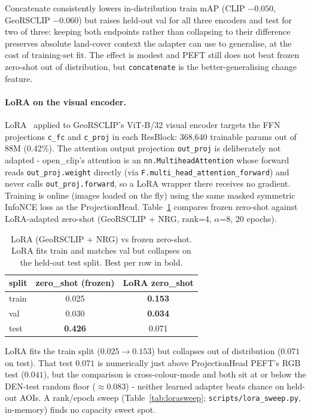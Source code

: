 \documentclass{article}
\begin{document}
Concatenate consistently lowers in-distribution train mAP (CLIP $-0.050$,
GeoRSCLIP $-0.060$) but raises held-out val for all three encoders and test for
two of three: keeping both endpoints rather than collapsing to their difference
preserves absolute land-cover context the adapter can use to generalise, at the
cost of training-set fit. The effect is modest and PEFT still does not beat
frozen zero-shot out of distribution, but \texttt{concatenate} is the
better-generalising change feature.

\paragraph{LoRA on the visual encoder.}
LoRA~\cite{lora} applied to GeoRSCLIP's ViT-B/32 visual encoder targets the FFN
projections \texttt{c\_fc} and \texttt{c\_proj} in each ResBlock: 368{,}640
trainable params out of 88M (0.42\%). The attention output projection
\texttt{out\_proj} is deliberately not adapted - open\_clip's attention is an
\texttt{nn.\allowbreak{}MultiheadAttention} whose forward reads \texttt{out\_proj.weight}
directly (via \texttt{F.\allowbreak{}multi\_\allowbreak{}head\_\allowbreak{}attention\_\allowbreak{}forward}) and never calls
\texttt{out\_proj.forward}, so a LoRA wrapper there receives no gradient.
Training is online (images loaded on the fly) using the same masked symmetric
InfoNCE loss as the ProjectionHead. Table~\ref{tab:lora} compares frozen
zero-shot against LoRA-adapted zero-shot (GeoRSCLIP + NRG, rank=4, $\alpha$=8, 20
epochs).

\begin{table}[H]
    \centering
    \caption{LoRA (GeoRSCLIP + NRG) vs frozen zero-shot. LoRA fits train and
    matches val but collapses on the held-out test split. Best per row in bold.}
    \label{tab:lora}
    \begin{tabular}{lcc}
        \toprule
        \textbf{split} & \textbf{zero\_shot (frozen)} & \textbf{LoRA zero\_shot} \\
        \midrule
        train & 0.025 & \textbf{0.153} \\
        val   & 0.030 & \textbf{0.034} \\
        test  & \textbf{0.426} & 0.071 \\
        \bottomrule
    \end{tabular}
\end{table}

LoRA fits the train split ($0.025 \rightarrow 0.153$) but collapses out of
distribution ($0.071$ on test). That test $0.071$ is numerically just above
ProjectionHead PEFT's RGB test ($0.041$), but the comparison is cross-colour-mode
and both sit at or below the DEN-test random floor ($\approx 0.083$) - neither
learned adapter beats chance on held-out AOIs. A rank/epoch sweep
(Table~\ref{tab:lorasweep}; \texttt{scripts/lora\_sweep.py}, in-memory) finds no
capacity sweet spot.
\end{document}
